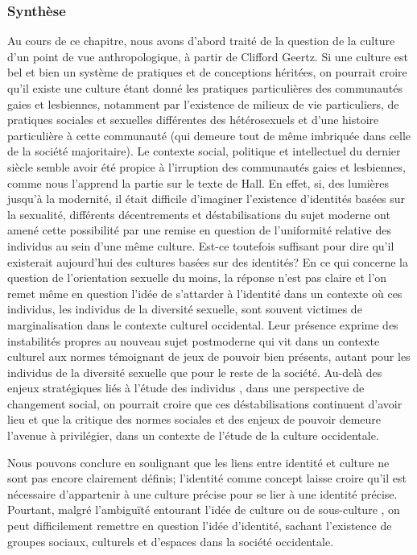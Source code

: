 \subsubsection{Synthèse}
\label{sec:synth_se} 
Au cours de ce chapitre, nous avons d'abord traité de la question de la culture d'un point de vue anthropologique, à partir de Clifford Geertz.
Si une culture est bel et bien un système de pratiques et de conceptions héritées, on pourrait croire qu'il existe une culture \lgbt{} étant donné les pratiques particulières des communautés gaies et lesbiennes, notamment par l'existence de milieux de vie particuliers, de pratiques sociales et sexuelles différentes des hétérosexuels et d'une histoire particulière à cette communauté (qui demeure tout de même imbriquée dans celle de la société majoritaire). 
Le contexte social, politique et intellectuel du dernier siècle semble avoir été propice à l'irruption des communautés gaies et lesbiennes, comme nous l'apprend la partie sur le texte de Hall. 
En effet, si, des lumières jusqu'à la modernité, il était difficile d'imaginer l'existence d'identités basées sur la sexualité, différents décentrements et déstabilisations du sujet moderne ont amené cette possibilité par une remise en question de l'uniformité relative des individus au sein d'une même culture. 
Est-ce toutefois suffisant pour dire qu'il existerait aujourd'hui des cultures basées sur des identités? 
En ce qui concerne la question de l'orientation sexuelle du moins, la réponse n'est pas claire et l'on remet même en question l'idée de s'attarder à l'identité dans un contexte où ces individus, les individus de la diversité sexuelle, sont souvent victimes de marginalisation dans le contexte culturel occidental. 
Leur présence exprime des instabilités propres au nouveau sujet postmoderne qui vit dans un contexte culturel aux normes témoignant de jeux de pouvoir bien présents, autant pour les individus de la diversité sexuelle que pour le reste de la société. 
Au-delà des enjeux stratégiques liés à l'étude des individus \lgbt{}, dans une perspective de changement social, on pourrait croire que ces déstabilisations continuent d'avoir lieu et que la critique des normes sociales et des enjeux de pouvoir demeure l'avenue à privilégier, dans un contexte de l'étude de la culture occidentale.

Nous pouvons conclure en soulignant que les liens entre identité et culture ne sont pas encore clairement définis; l'identité comme concept laisse croire qu'il est nécessaire d'appartenir à une culture précise pour se lier à une identité précise. 
Pourtant, malgré l'ambiguïté entourant l'idée de culture ou de sous-culture \lgbt{}, on peut difficilement remettre en question l'idée d'identité, sachant l'existence de groupes sociaux, culturels et d'espaces \lgbt{} dans la société occidentale.

